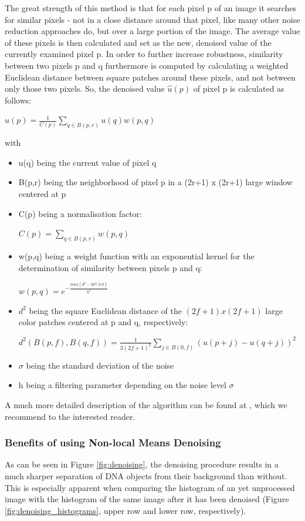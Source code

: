 \documentclass{article}
\begin{document}
The great strength of this method is that for each pixel p of an image it searches for similar pixels - not in a close distance around that pixel, like many other noise reduction approaches do, but over a large portion of the image. The average value of these pixels is then calculated and set as the new, denoised value of the currently examined pixel p. In order to further increase robustness, similarity between two pixels p and q furthermore is computed by calculating a weighted Euclidean distance between square patches around these pixels, and not between only those two pixels. 
So, the denoised value $\hat{u}(p)$ of pixel p is calculated as follows:
\begin{center}
	$ \hat{u}(p) = \frac{1}{C(p)}\sum_{q \in B(p,r)}u(q)w(p,q) $
\end{center}
with
\begin{itemize}
	\item u(q) being the current value of pixel q
	\item B(p,r) being the  neighborhood of pixel p in a (2r+1) x (2r+1) large window centered at p
	\item C(p) being a normalisation factor:
	\begin{center} $ C(p) = \sum_{q \in B(p,r)} w(p,q) $ \end{center}
	\item w(p,q) being a weight function with an exponential kernel for the determination of similarity between pixels p and q:
	\begin{center}$ w(p,q) = e^{-\frac{max(d^2-2\sigma^2, 0.0)}{h^2}} $ \end{center}
	\item $d^2$ being the square Euclidean distance of the $(2f+1) x (2f+1)$ large color patches centered at p and q, respectively:
	\begin{center}
		$ d^2(B(p,f), B(q,f)) = \frac{1}{3(2f+1)^2}\sum_{j \in B(0,f)}(u(p+j)-u(q+j))^2$
	\end{center}
	\item $\sigma$ being the standard deviation of the noise
	\item h being a filtering parameter depending on the noise level $\sigma$
\end{itemize}
A much more detailed description of the algorithm can be found at \cite{ipol.2011.bcm_nlm}, which we recommend to the interested reader.

\subsubsection{Benefits of using Non-local Means Denoising}
As can be seen in Figure \ref{fig:denoising}, the denoising procedure results in a much sharper separation of DNA objects from their background than without. This is especially apparent when comparing the histogram of an yet unprocessed image with the histogram of the same image after it has been denoised (Figure \ref{fig:denoising_histograms}, upper row and lower row, respectively).
\end{document}
